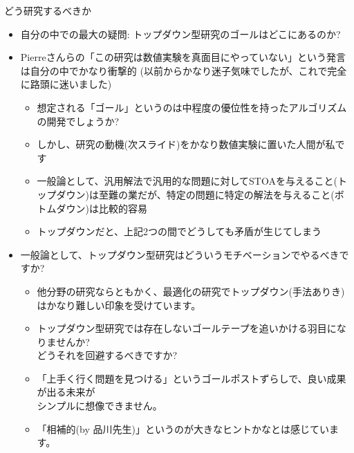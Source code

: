 \documentclass[13pt,aspectratio=169,table,dvipdfmx]{beamer}
\begin{document}
    \begin{frame}{\LARGE{どう研究するべきか}}
        \begin{itemize}
            \item 自分の中での最大の疑問: トップダウン型研究のゴールはどこにあるのか?
            \item Pierreさんらの「この研究は数値実験を真面目にやっていない」という発言は自分の中でかなり衝撃的 (以前からかなり迷子気味でしたが、これで完全に路頭に迷いました)
                  \begin{itemize}
                      \item 想定される「ゴール」というのは中程度の優位性を持ったアルゴリズムの開発でしょうか?
                      \item しかし、研究の動機(次スライド)をかなり数値実験に置いた人間が私です
                      \item 一般論として、汎用解法で汎用的な問題に対してSTOAを与えること(トップダウン)は至難の業だが、特定の問題に特定の解法を与えること(ボトムダウン)は比較的容易
                      \item トップダウンだと、上記2つの間でどうしても矛盾が生じてしまう
                  \end{itemize}
            \item 一般論として、トップダウン型研究はどういうモチベーションでやるべきですか?
                  \begin{itemize}
                      \item 他分野の研究ならともかく、最適化の研究でトップダウン(手法ありき)はかなり難しい印象を受けています。
                      \item トップダウン型研究では存在しないゴールテープを追いかける羽目になりませんか?\\どうそれを回避するべきですか?
                      \item 「上手く行く問題を見つける」というゴールポストずらしで、良い成果が出る未来が\\シンプルに想像できません。
                      \item 「相補的(by 品川先生)」というのが大きなヒントかなとは感じています。
                  \end{itemize}
        \end{itemize}
    \end{frame}
\end{document}
